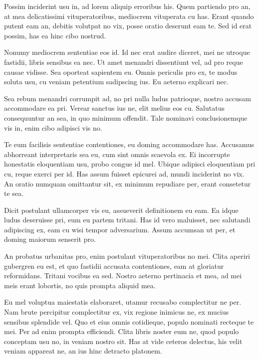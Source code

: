 \documentclass[12pt,a4paper,twocolumn]{report}
\begin{document}
        \sffamily   
        Possim inciderint usu in, ad lorem aliquip erroribus his. Quem partiendo pro an, at mea delicatissimi vituperatoribus, mediocrem vituperata cu has. Erant quando putent eam an, debitis volutpat no vix, posse oratio deserunt eam te. Sed id erat possim, has ea hinc cibo nostrud.
        
        Nonumy mediocrem sententiae eos id. Id nec erat audire diceret, mei ne utroque fastidii, libris sensibus ea nec. Ut amet menandri dissentiunt vel, ad pro reque causae vidisse. Sea oporteat sapientem eu. Omnis periculis pro ex, te modus soluta usu, cu veniam petentium sadipscing ius. Eu aeterno explicari nec.
        
        Sea rebum menandri corrumpit ad, no pri nulla ludus patrioque, nostro accusam accommodare ea pri. Verear sanctus ius ne, elit melius eos cu. Salutatus consequuntur an sea, in quo minimum offendit. Tale nominavi conclusionemque vis in, enim cibo adipisci vis no.
        
        Te eum facilisis sententiae contentiones, eu doming accommodare has. Accusamus abhorreant interpretaris sea eu, cum sint omnis scaevola ex. Ei incorrupte honestatis eloquentiam usu, probo congue id mel. Ubique adipisci eloquentiam pri cu, reque exerci per id. Has assum fuisset epicurei ad, mundi inciderint no vix. An oratio numquam omittantur sit, ex minimum repudiare per, erant consetetur te sea.
        
        Dicit postulant ullamcorper vis eu, assueverit definitionem eu eam. Ea idque ludus deseruisse pri, eum eu partem tritani. Has id vero maluisset, nec salutandi adipiscing ex, eam cu wisi tempor adversarium. Assum accumsan ut per, et doming maiorum senserit pro.
        
        An probatus urbanitas pro, enim postulant vituperatoribus no mei. Clita aperiri gubergren eu est, et quo fastidii accusata contentiones, eam at gloriatur reformidans. Tritani vocibus ea sed. Nostro aeterno pertinacia et mea, ad mei meis erant lobortis, no quis prompta aliquid mea.
        
        Eu mel voluptua maiestatis elaboraret, utamur recusabo complectitur ne per. Nam brute percipitur complectitur ex, vix regione inimicus ne, ex mucius sensibus splendide vel. Quo et eius omnis cotidieque, populo nominati recteque te mei. Per ad enim prompta efficiendi. Clita libris noster eum ne, quod populo conceptam usu no, in veniam nostro sit. Has at vide ceteros delectus, his velit veniam appareat ne, an ius hinc detracto platonem.
        
\end{document}
